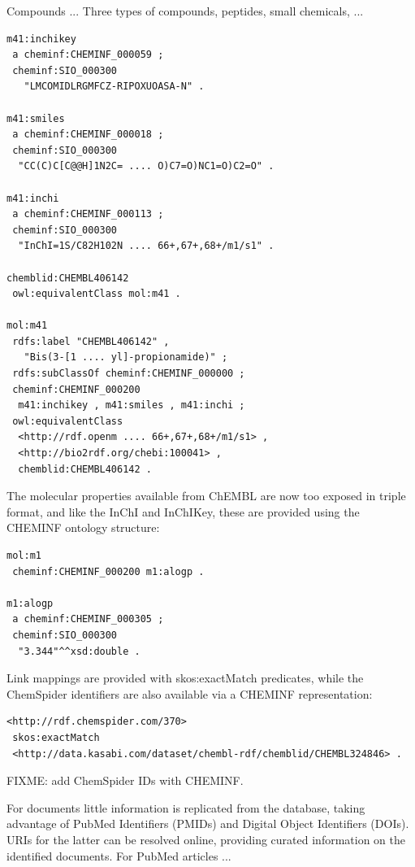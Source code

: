 \documentclass[sw]{iosart2c}
\begin{document}
Compounds ... Three types of compounds, peptides, small chemicals, ...

\begin{footnotesize}
\begin{verbatim}
m41:inchikey
 a cheminf:CHEMINF_000059 ;
 cheminf:SIO_000300
   "LMCOMIDLRGMFCZ-RIPOXUOASA-N" .

m41:smiles
 a cheminf:CHEMINF_000018 ;
 cheminf:SIO_000300
  "CC(C)C[C@@H]1N2C= .... O)C7=O)NC1=O)C2=O" .

m41:inchi
 a cheminf:CHEMINF_000113 ;
 cheminf:SIO_000300
  "InChI=1S/C82H102N .... 66+,67+,68+/m1/s1" .

chemblid:CHEMBL406142
 owl:equivalentClass mol:m41 .

mol:m41
 rdfs:label "CHEMBL406142" , 
   "Bis(3-[1 .... yl]-propionamide)" ;
 rdfs:subClassOf cheminf:CHEMINF_000000 ;
 cheminf:CHEMINF_000200
  m41:inchikey , m41:smiles , m41:inchi ;
 owl:equivalentClass 
  <http://rdf.openm .... 66+,67+,68+/m1/s1> ,
  <http://bio2rdf.org/chebi:100041> ,
  chemblid:CHEMBL406142 .
\end{verbatim}
\end{footnotesize}

The molecular properties available from ChEMBL are now too exposed in triple format,
and like the InChI and InChIKey, these are provided using the CHEMINF ontology structure:

\begin{footnotesize}
\begin{verbatim}
mol:m1
 cheminf:CHEMINF_000200 m1:alogp .

m1:alogp
 a cheminf:CHEMINF_000305 ;
 cheminf:SIO_000300
  "3.344"^^xsd:double .
\end{verbatim}
\end{footnotesize}

Link mappings are provided with skos:exactMatch predicates, while the ChemSpider identifiers
are also available via a CHEMINF representation:
 
\begin{tiny}
\begin{verbatim}
<http://rdf.chemspider.com/370>
 skos:exactMatch
 <http://data.kasabi.com/dataset/chembl-rdf/chemblid/CHEMBL324846> .
\end{verbatim}
\end{tiny}

FIXME: add ChemSpider IDs with CHEMINF.

For documents little information is replicated from the database, taking advantage
of PubMed Identifiers (PMIDs) and Digital Object Identifiers (DOIs). URIs for the
latter can be resolved online, providing curated information on the identified
documents. For PubMed articles ...
\end{document}
